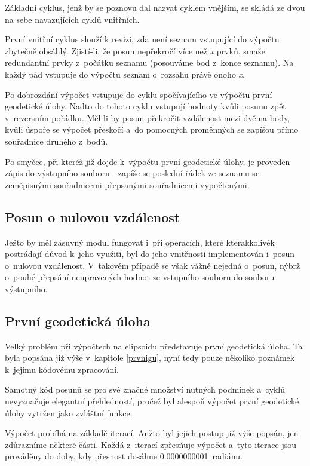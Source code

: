 Základní cyklus, jenž by se poznovu dal nazvat cyklem vnějším, se skládá ze dvou na sebe
navazujících cyklů vnitřních. 

První vnitřní cyklus slouží k revizi, zda není seznam vstupující do výpočtu zbytečně obsáhlý.
Zjistí-li, že posun nepřekročí více než \textit{x} prvků, smaže redundantní prvky z~počátku seznamu (posouváme bod
z~konce seznamu). Na každý pád vstupuje do výpočtu seznam o~rozsahu právě onoho \textit{x}. 

Po dobrozdání výpočet vstupuje do cyklu spočívajícího ve výpočtu první geode\-tické úlohy.
Nadto do tohoto cyklu vstupují hodnoty kvůli posunu zpět v~reversním pořádku. Měl-li by
posun překročit vzdálenost mezi dvěma body, kvůli úspoře se výpočet přeskočí a~do pomocných
proměnných se zapíšou přímo souřadnice druhého z~bodů. 

Po smyčce, při kteréž již dojde k~výpočtu první geodetické úlohy, je proveden zápis do výstupního
souboru - zapíše se poslední řádek ze seznamu se zeměpisnými souřadnicemi přepsanými
souřadnicemi vypočtenými. 

\subsection{Posun o nulovou vzdálenost}
\label{nulovavzdalenost}

Ježto by měl zásuvný modul fungovat i~při
operacích, které kterakkolivěk postrádají důvod k~jeho využití, byl do jeho
vnitřností implementován i~posun o~nulovou vzdálenost.
V~takovém případě se však vážně nejedná o~posun, nýbrž o~pouhé přepsání
neupravených hodnot ze vstupního souboru do souboru výstupního. 

\subsection{První geodetická úloha}
\label{prvniguplugin}

Velký problém při výpočtech na elipsoidu představuje první geodetická úloha. Ta byla popsána
již výše v~kapitole \ref{prvnigu}, nyní tedy pouze několiko poznámek k~jejímu kódovému zpracování. 

Samotný kód posunů se pro své značné množství nutných podmínek a~cyklů nevyznačuje
elegantní přehledností, pročež byl alespoň výpočet první geodetické úlohy vytržen jako zvláštní funkce.

Výpočet probíhá na základě iterací. Anžto byl jejich postup již výše popsán, jen zdůrazníme
některé části. Každá z~iterací zpřesňuje výpočet a~tyto iterace jsou prováděny do doby,
kdy přesnost dosáhne 0.0000000001~radiánu. 

